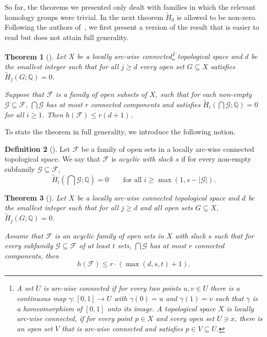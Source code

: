 \documentclass[a4paper,12pt]{amsart}
\newcommand{\Q}{\mathbb{Q}} 	%
\newcommand{\F}{\mathcal{F}} 	%
\newtheorem{theorem}{Theorem}
\theoremstyle{definition}
\newtheorem{definition}[theorem]{Definition}
\begin{document}
So far, the theorems we presented only dealt with families in which the relevant homology groups were trivial. In the next theorem $\widetilde H_0$ is allowed to be non-zero. 
Following the authors of~\cite{multinerve13}, we first present a version of the result that is easier to read but does not attain full generality.
\begin{theorem}[\cite{multinerve13}]\label{thm:multinerveOne}
Let $X$ be a locally arc-wise connected\footnote{A set $U$ is \emph{arc-wise connected} if for every two points $u,v\in U$ there is a continuous map $\gamma\colon [0,1]\to U$ with $\gamma(0)=u$ and $\gamma(1)=v$ such that $\gamma$ is a homeomorphism of $[0,1]$ onto its image.
A topological space $X$ is \emph{locally arc-wise connected}, if for every point $p\in X$ and every open set $U\ni x$, there is an open set $V$ that is arc-wise connected and satisfies $p\in V\subseteq U$.} topological space and $d$ be the smallest integer such that for all $j\geq d$ every open set $G\subseteq X$ satisfies $\widetilde H_j(G;\Q)=0$.

Suppose that $\mathcal F$ is a family of open subsets of $X$, such that for each non-empty $\mathcal G\subseteq \mathcal F$,
$\bigcap \mathcal G$ has at most $r$ connected components and satisfies $\widetilde{H}_i(\bigcap \mathcal G;\Q)=0$ for all $i\geq 1$.
Then $h(\mathcal F)\leq r(d+1)$.
\end{theorem}
To state the theorem in full generality, we introduce the following notion.
\begin{definition}[\cite{multinerve13}]
Let $\mathcal F$ be a family of open sets in a locally arc-wise connected topological space.
We say that $\mathcal F$ is \emph{acyclic with slack $s$} if for every non-empty subfamily $\mathcal G\subseteq\mathcal F$,
\[
\widetilde{H}_i(\bigcap \mathcal G;\Q)=0\qquad\text{for all }i\geq \max(1, s-|\mathcal G|).
\]
\end{definition}
\begin{theorem}[\cite{multinerve13}]\label{thm:multinerveTwo}
Let $X$ be a locally arc-wise connected topological space and $d$ be the smallest integer such that for all $j\geq d$ and all open sets $G\subseteq X$, $\widetilde H_j(G;\Q)=0$.

Assume that $\mathcal F$ is an acyclic family of open sets in $X$ with slack $s$ such that for every subfamily $\mathcal G\subseteq \F$
of at least $t$ sets, $\bigcap \mathcal G$ has at most $r$ connected components,
then 
\[h(\mathcal F)\leq r\cdot \left(\max(d,s,t)+1\right).\]
\end{theorem}
\end{document}
